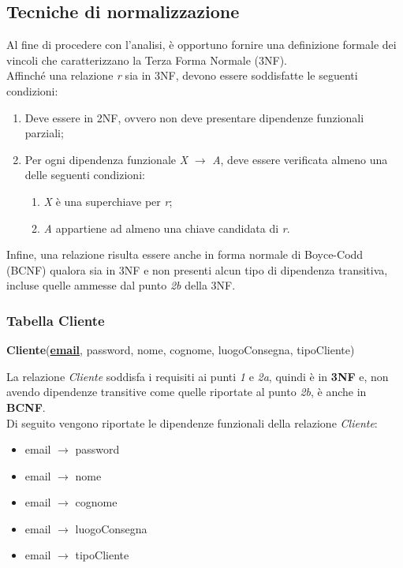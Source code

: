 \documentclass[12pt,a4paper]{article}
\begin{document}
    \subsection{Tecniche di normalizzazione}
    Al fine di procedere con l'analisi, è opportuno fornire una definizione formale dei vincoli che caratterizzano la Terza Forma Normale (3NF).\\
    Affinché una relazione \textit{r} sia in 3NF, devono essere soddisfatte le seguenti condizioni:

    \begin{enumerate}[leftmargin=1.3em]
        \item Deve essere in 2NF, ovvero non deve presentare dipendenze funzionali parziali;
        \item Per ogni dipendenza funzionale \textit{X} $\rightarrow$ \textit{A}, deve essere verificata almeno una delle seguenti condizioni:
            \begin{enumerate}[leftmargin=1.3em, label=\alph*.]
            \item \textit{X} è una superchiave per \textit{r};
            \item \textit{A} appartiene ad almeno una chiave candidata di \textit{r}.
        \end{enumerate}
    \end{enumerate}

    \vspace{5pt}
    \noindent
    Infine, una relazione risulta essere anche in forma normale di Boyce-Codd (BCNF) qualora sia in 3NF e non presenti alcun tipo di dipendenza transitiva, incluse quelle ammesse dal punto \textit{2b} della 3NF.

    \subsubsection*{Tabella Cliente}
    \begin{tcolorbox}[
        colback=gray!8,
        colframe=black!30,
        title=
    ]
        \textbf{Cliente}(\textbf{\uline{email}}, password, nome, cognome, luogoConsegna, tipoCliente)
    \end{tcolorbox}

    \noindent
    La relazione \textit{Cliente} soddisfa i requisiti ai punti \textit{1} e \textit{2a}, quindi è in \textbf{3NF} e, non avendo dipendenze transitive come quelle riportate al punto \textit{2b}, è anche in \textbf{BCNF}.\\
    Di seguito vengono riportate le dipendenze funzionali della relazione \textit{Cliente}:
    \begin{itemize}[leftmargin=1em, label=$\circ$]
        \item email $\rightarrow$ password
        \item email $\rightarrow$ nome
        \item email $\rightarrow$ cognome
        \item email $\rightarrow$ luogoConsegna
        \item email $\rightarrow$ tipoCliente
    \end{itemize}
    
\end{document}
